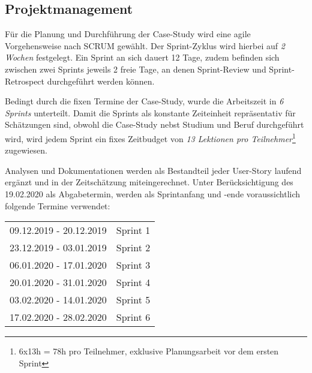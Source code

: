 \subsection{Projektmanagement}
Für die Planung und Durchführung der Case-Study wird eine agile Vorgehensweise nach SCRUM gewählt. Der Sprint-Zyklus wird hierbei auf \emph{2 Wochen} festgelegt. Ein Sprint an sich dauert 12 Tage, zudem befinden sich zwischen zwei Sprints jeweils 2 freie Tage, an denen Sprint-Review und Sprint-Retrospect durchgeführt werden können.

Bedingt durch die fixen Termine der Case-Study, wurde die Arbeitszeit in \emph{6 Sprints} unterteilt. Damit die Sprints als konstante Zeiteinheit repräsentativ für Schätzungen sind, obwohl die Case-Study nebst Studium und Beruf durchgeführt wird, wird jedem Sprint ein fixes Zeitbudget von \emph{13 Lektionen pro Teilnehmer}\footnote{6x13h = 78h pro Teilnehmer, exklusive Planungsarbeit vor dem ersten Sprint} zugewiesen.

Analysen und Dokumentationen werden als Bestandteil jeder User-Story laufend ergänzt und in der Zeitschätzung miteingerechnet. Unter Berücksichtigung des 19.02.2020 als Abgabetermin, werden als Sprintanfang und -ende voraussichtlich folgende Termine verwendet:

\begin{center}
  \begin{tabular}{ l l } 
    09.12.2019 - 20.12.2019 & Sprint 1 \\ 
    23.12.2019 - 03.01.2019 & Sprint 2 \\ 
    06.01.2020 - 17.01.2020 & Sprint 3 \\ 
    20.01.2020 - 31.01.2020 & Sprint 4 \\
    03.02.2020 - 14.01.2020 & Sprint 5 \\
    17.02.2020 - 28.02.2020 & Sprint 6 \\ 
  \end{tabular}
\end{center}
